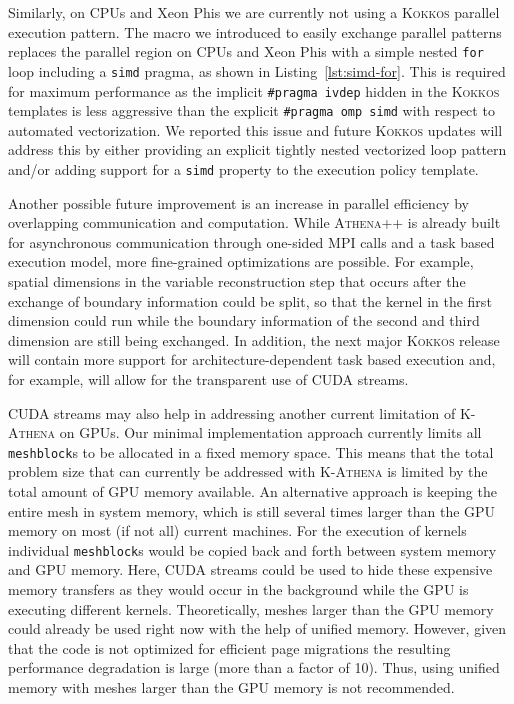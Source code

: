 \documentclass[10pt,journal,compsoc]{IEEEtran}
\newcommand{\textcode}[1]{\textsc{#1}}
\newcommand{\kokkos}{\textcode{Kokkos}\xspace}
\newcommand{\athena}{\textcode{Athena++}\xspace}
\newcommand{\kathena}{\textcode{K-Athena}\xspace}
\newcommand{\cuda}{\textcode{CUDA}\xspace}
\newcommand{\mpi}{\textcode{MPI}\xspace}
\begin{document}
Similarly, on CPUs and Xeon Phis we are currently not using a \kokkos parallel execution 
pattern.
The macro we introduced to easily exchange parallel patterns replaces the parallel region
on CPUs and Xeon Phis with a simple nested \texttt{for} loop including a \texttt{simd} 
pragma, as shown in Listing~\ref{lst:simd-for}.
This is required for maximum performance 
as the implicit \verb=#pragma ivdep= hidden in the \kokkos templates is less
aggressive than the explicit  \verb=#pragma omp simd= with respect to automated
vectorization.
We reported this issue and future \kokkos updates will address this by either providing an
explicit tightly nested vectorized loop pattern and/or adding support for a \verb=simd= 
property to the execution policy template.

Another possible future improvement is an increase in parallel efficiency by overlapping
communication and computation.
While \athena is already built for asynchronous communication 
through one-sided \mpi calls
and a task based execution
model, more fine-grained optimizations are possible.
For example, spatial dimensions in the variable reconstruction step that occurs after 
the exchange of 
boundary information could be split, so that the kernel in the first dimension could run
while the boundary information of the second and third dimension are still being exchanged.
In addition, the next major \kokkos release will contain more support
for architecture-dependent task based execution and, for example, will allow for the transparent use of 
\cuda streams.

\cuda streams may also help in addressing another current limitation of \kathena on GPUs.
Our minimal implementation approach currently limits all \texttt{meshblock}s to be allocated
in a fixed memory space.
This means that the total problem size that can currently be addressed with \kathena is 
limited by the total amount of GPU memory available.
An alternative approach is keeping the entire mesh in system memory, which is still several
times larger than the GPU memory on most (if not all) current machines.
For the execution of kernels individual \texttt{meshblock}s would be copied back and forth
between system memory and GPU memory.
Here, \cuda streams could be used to hide these expensive memory transfers as they would occur
in the background while the GPU is executing different kernels.
Theoretically, meshes larger than the GPU memory could already be used right now with the
help of unified memory.
However, given that the code is not optimized for efficient page migrations the resulting
performance degradation is large (more than a factor of 10). 
Thus, using unified memory with meshes larger than the GPU memory is not recommended.
\end{document}
